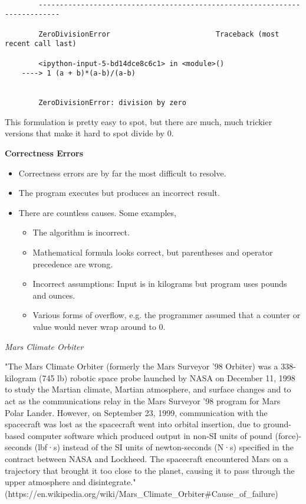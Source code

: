 \documentclass[11pt]{article}
\providecommand{\tightlist}{%
      \setlength{\itemsep}{0pt}\setlength{\parskip}{0pt}}
\begin{document}
    \begin{Verbatim}[commandchars=\\\{\}]

        ---------------------------------------------------------------------------

        ZeroDivisionError                         Traceback (most recent call last)

        <ipython-input-5-bd14dce8c6c1> in <module>()
    ----> 1 (a + b)*(a-b)/(a-b)
    

        ZeroDivisionError: division by zero

    \end{Verbatim}

    This formulation is pretty easy to spot, but there are much, much
trickier versions that make it hard to spot divide by 0.

    \textbf{Correctness Errors}

\begin{itemize}
\item
  Correctness errors are by far the most difficult to resolve.
\item
  The program executes but produces an incorrect result.
\item
  There are countless causes. Some examples,

  \begin{itemize}
  \tightlist
  \item
    The algorithm is incorrect.
  \item
    Mathematical formula looks correct, but parentheses and operator
    precedence are wrong.
  \item
    Incorrect assumptions: Input is in kilograms but program uses pounds
    and ounces.
  \item
    Various forms of overflow, e.g. the programmer assumed that a
    counter or value would never wrap around to 0.
  \end{itemize}
\end{itemize}

\emph{Mars Climate Orbiter}

"The Mars Climate Orbiter (formerly the Mars Surveyor '98 Orbiter) was a
338-kilogram (745 lb) robotic space probe launched by NASA on December
11, 1998 to study the Martian climate, Martian atmosphere, and surface
changes and to act as the communications relay in the Mars Surveyor '98
program for Mars Polar Lander. However, on September 23, 1999,
communication with the spacecraft was lost as the spacecraft went into
orbital insertion, due to ground-based computer software which produced
output in non-SI units of pound (force)-seconds (lbf·s) instead of the
SI units of newton-seconds (N·s) specified in the contract between NASA
and Lockheed. The spacecraft encountered Mars on a trajectory that
brought it too close to the planet, causing it to pass through the upper
atmosphere and disintegrate."
(https://en.wikipedia.org/wiki/Mars\_Climate\_Orbiter\#Cause\_of\_failure)
\end{document}
